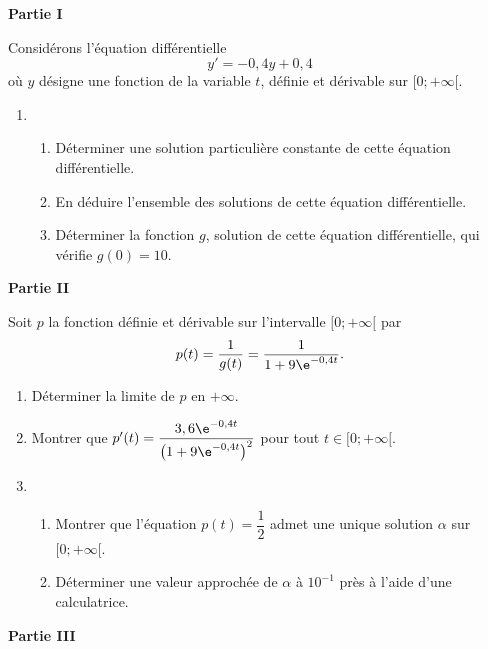 \textbf{Partie I}

\medskip

Considérons l'équation différentielle \[y'= -0,4y + 0,4\] %
où $y$ désigne une fonction de la variable $t$, définie et dérivable sur $[0; + \infty[$.

\begin{enumerate}
	\item 
	\begin{enumerate}
		\item Déterminer une solution particulière constante de cette équation différentielle. 
		\item En déduire l'ensemble des solutions de cette équation différentielle.
		\item Déterminer la fonction $g$, solution de cette équation différentielle, qui vérifie $g(0) = 10$.
	\end{enumerate}
\end{enumerate}

\textbf{Partie II}

\medskip

Soit $p$ la fonction définie et dérivable sur l'intervalle $[0;+ \infty[$ par \[p(t) = \dfrac{1}{g(t)} = \dfrac{1}{1 + 9\e^{-0,4t}}.\]

\begin{enumerate}
	\item Déterminer la limite de $p$ en $+ \infty$. 
	\item Montrer que $p'(t) = \dfrac{3,6\e^{-0,4t}}{ \left(1 + 9\e^{-0,4t}\right)^2}$ pour tout $t \in  [0;+ \infty[$.
	
	\item
	\begin{enumerate}
		\item Montrer que l'équation $p(t) = \dfrac{1}{2}$ admet une unique solution $\alpha$ sur $[0;+ \infty[$. 
		\item Déterminer une valeur approchée de $\alpha$ à $10^{-1}$ près à l'aide d'une calculatrice.
	\end{enumerate}
\end{enumerate}

\textbf{Partie III}

